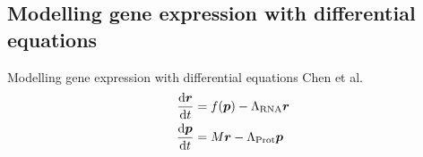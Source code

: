 \subsection{Modelling gene expression with differential equations}
\begin{frame}{Modelling gene expression with differential equations}
Chen et al.~\cite{Chen99}
\begin{subequations}
\label{eq:Chen99}
\begin{align}
\dv{\boldsymbol{r}}{t} &=
f(\boldsymbol{p}) - \Lambda_\text{RNA} \boldsymbol{r}
\\
\dv{\boldsymbol{p}}{t} &=
M \boldsymbol{r} - \Lambda_\text{Prot} \boldsymbol{p}
\end{align}
\end{subequations}



\end{frame}
